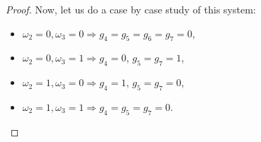 \documentclass[10pt,a4paper]{amsart}
\begin{document}
\begin{proof}
\noindent Now, let us do a case by case study of this system:
\begin{itemize}
\item $\omega_2=0,\omega_3=0\Rightarrow g_4=g_5=g_6=g_7=0$,

\item $\omega_2=0,\omega_3=1\Rightarrow g_4=0$, $g_5=g_7=1$,

\item $\omega_2=1,\omega_3=0\Rightarrow g_4=1$, $g_5=g_7=0$,

\item $\omega_2=1,\omega_3=1\Rightarrow g_4=g_5=g_7=0$.

\end{itemize}
$ $
\end{proof}
\end{document}
